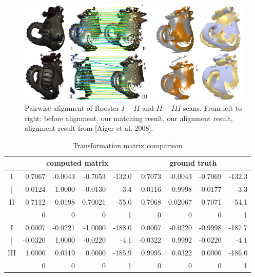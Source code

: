 \begin{figure}[t!]
\centering
  \includegraphics[width=0.99\linewidth]{figures/RoosterPair2.pdf}
  \caption{Pairwise alignment of Rooster \emph{$I-II$} and \emph{$II-III$} scans.
  From left to right: before alignment, our matching result, our alignment result, alignment result from [Aiger et al. 2008].}
\label{fig:3DPair}
\end{figure}

\begin{table}[tb]
\centering
\tabcolsep=1pt
\setlength{\aboverulesep}{0pt}
\setlength{\belowrulesep}{0pt}
\caption{Transformation matrix comparison}
\hspace{-5ex}
\label{tab:matrix}
\small
\begin{tabular}{|c |rrrr |rrrr|}
\toprule
 & \multicolumn{4}{|c|}{ {computed matrix}} & \multicolumn{4}{c|}{ {ground truth}} \\
\hline
{I} & {0.7067} 	& {-0.0043}   & {-0.7053}	& {-132.0}    & {0.7073} 	& {-0.0043}   & {-0.7069}	& {-132.3}   \\
{|}&{-0.0124}     &  {1.0000}	& {-0.0130} 	& {-3.4}  & {-0.0116}	& {0.9998}	& {-0.0177}	& {-3.3}   \\
{II}&{0.7112}	    & {0.0198}	& {0.70021}	& {-55.0}  & {0.7068}     & {0.02067}   & {0.7071}	& {-54.1}   \\
&{0}             & {0}	        & {0}	        & {1}          & {0}             & {0}	        & {0}	        & {1}          \\
\hline
{I} & {0.0007} & {-0.0221} &  {-1.0000} & {-188.0}          & {0.0007} & {-0.0220} &  {-0.9998} & {-187.7}  \\
{|}  &{-0.0320} & {1.0000} &{-0.0220} & {-4.1}  	&{-0.0322} & {0.9992} &{-0.0220} & {-4.1}   \\
{III} &{1.0000} & {0.0319} &{0.0000} &{-185.9}       &{0.9995} & {0.0322} &{0.0000} &{-186.0}  \\
&        {0}             & {0}	        & {0}	        & {1}          & {0}             & {0}	        & {0}	        & {1}          \\
\bottomrule
\end{tabular}%
\end{table}%



